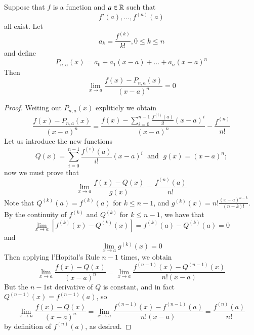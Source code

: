 \documentclass[12pt, a4paper, oneside, openright, titlepage]{book}
\begin{document}
\begin{thm}\label{thm:smoldiff}
    Suppose that $f$ is a function and $a \in \mathbb R$ such that \begin{equation*}
        f'(a),...,f^{(n)}(a)
    \end{equation*}
    all exist. Let \begin{equation*}
        a_k = \frac{f^{(k)}}{k!}, 0\leq k \leq n
    \end{equation*}
    and define \begin{equation*}
        P_{n,a}(x) = a_0 + a_1(x-a) + \hdots + a_n(x-a)^n
    \end{equation*}
    Then \begin{equation*}
        \lim\limits_{x\rightarrow a}\frac{f(x)-P_{n,a}(x)}{(x-a)^n} = 0
    \end{equation*}
\end{thm}
\begin{proof}
    Weiting out $P_{n,a}(x)$ expliticly we obtain \begin{equation*}
        \frac{f(x) - P_{n,a}(x)}{(x-a)^n} = \frac{f(x) - \sum\limits_{i=0}^{n-1}\frac{f^{(i)}(a)}{i!}(x-a)^i}{(x-a)^n} - \frac{f^{(n)}}{n!}
    \end{equation*}
    Let us introduce the new functions \begin{equation*}
        Q(x) = \sum\limits_{i=0}^{n-1}\frac{f^{(i)}(a)}{i!}(x-a)^i\;\text{ and }\; g(x) = (x-a)^n;
    \end{equation*}
    now we must prove that \begin{equation*}
        \lim\limits_{x\rightarrow a}\frac{f(x) - Q(x)}{g(x)} = \frac{f^{(n)}(a)}{n!}
    \end{equation*}
    Note that $Q^{(k)}(a) = f^{(k)}(a)$ for $k \leq n-1$, and $g^{(k)}(x) =n!\frac{(x-a)^{n-k}}{(n-k)!}$. By the continuity of $f^{(k)}$ and $Q^{(k)}$ for $k \leq n-1$, we have that \begin{equation*}
        \lim\limits_{x\rightarrow a}\left[f^{(k)}(x) - Q^{(k)}(x)\right] = f^{(k)}(a) - Q^{(k)}(a) = 0
    \end{equation*}
    and \begin{equation*}
        \lim\limits_{x\rightarrow a}g^{(k)}(x) = 0
    \end{equation*}
    Then applying l'Hopital's Rule $n-1$ times, we obtain \begin{equation*}
        \lim\limits_{x\rightarrow a}\frac{f(x)-Q(x)}{(x-a)^n} = \lim\limits_{x\rightarrow a}\frac{f^{(n-1)}(x) - Q^{(n-1)}(x)}{n!(x-a)}
    \end{equation*}
    But the $n-1$st derivative of $Q$ is constant, and in fact $Q^{(n-1)}(x) = f^{(n-1)}(a)$, so \begin{equation*}
        \lim\limits_{x\rightarrow a}\frac{f(x)-Q(x)}{(x-a)^n} = \lim\limits_{x\rightarrow a}\frac{f^{(n-1)}(x)-f^{(n-1)}(a)}{n!(x-a)} = \frac{f^{(n)}(a)}{n!}
    \end{equation*}
    by definition of $f^{(n)}(a)$, as desired.
\end{proof}
\end{document}
